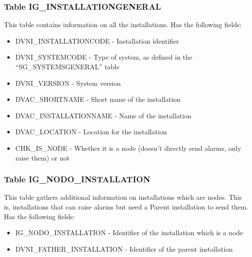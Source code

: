 \documentclass[a4paper,10pt]{book}
\begin{document}
\subsubsection*{Table IG\_INSTALLATIONGENERAL}
This table contains information on all the installations. Has the following fields:
\begin{itemize}
 \item DVNI\_INSTALLATIONCODE - Installation identifier
 \item DVNI\_SYSTEMCODE - Type of system, as defined in the ``SG\_SYSTEMSGENERAL'' table
 \item DVNI\_VERSION - System version
 \item DVAC\_SHORTNAME - Short name of the installation
 \item DVAC\_INSTALLATIONNAME - Name of the installation
 \item DVAC\_LOCATION - Location for the installation
 \item CHK\_IS\_NODE - Whether it is a node (doesn't directly send alarms, only raise them) or not
\end{itemize}

\subsubsection*{Table IG\_NODO\_INSTALLATION}
This table gathers additional information on installations which are nodes. This is, installations that can raise alarms but need a Parent installation to send them. Has the following fields:
\begin{itemize}
 \item IG\_NODO\_INSTALLATION - Identifier of the installation which is a node
 \item DVNI\_FATHER\_INSTALLATION - Identifier of the parent installation
\end{itemize}
\end{document}

